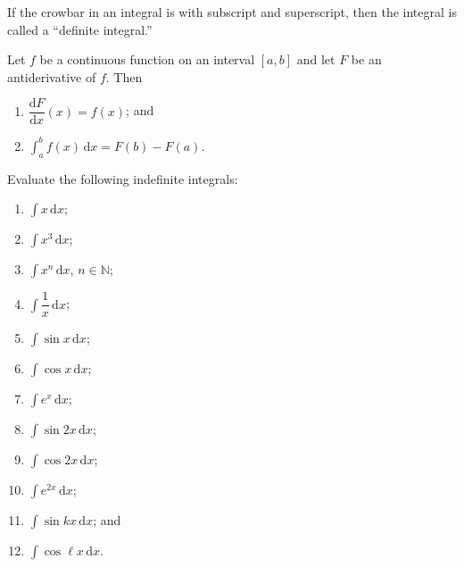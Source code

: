 \documentclass[11pt]{article}
\theoremstyle{break}
\theoremstyle{no_label}
\newcommand{\derivative}[2]{\dfrac{\dd{#1}}{\dd{#2}}}
\newcommand{\dd}{\text{d}}
\newcommand{\ddi}{\text{$\,$d}}
\newcommand{\bbN}{\mathbb{N}}
\numberwithin{equation}{theorem}
\begin{document}
\begin{remark}
    If the crowbar in an integral is with subscript and superscript, then the integral is called a ``definite integral.''
\end{remark}

\begin{theorem}
    Let $f$ be a continuous function on an interval $[a, b]$ and let $F$ be an antiderivative of $f$. Then
    \begin{enumerate}
        \item $\derivative{F}{x}(x)=f(x)$; and
        \item $\displaystyle\int_a^b f(x)\ddi x=F(b)-F(a)$.
    \end{enumerate}
\end{theorem}

\newpage

\begin{example}
    Evaluate the following indefinite integrals:\vspace{-1.8em}
    \begin{multicols}{3}
        \begin{enumerate}
            \item $\displaystyle\int x\ddi x$;
            \item $\displaystyle\int x^3\ddi x$;
            \item $\displaystyle\int x^n\ddi x$, $n\in\bbN$;
            \item $\displaystyle\int \dfrac{1}{x}\ddi x$;
            \item $\displaystyle\int \sin x\ddi x$;
            \item $\displaystyle\int \cos x\ddi x$;
            \item $\displaystyle\int e^x\ddi x$;
            \item $\displaystyle\int \sin 2x\ddi x$;
            \item $\displaystyle\int \cos 2x\ddi x$;
            \item $\displaystyle\int e^{2x}\ddi x$;
            \item $\displaystyle\int \sin kx\ddi x$; and
            \item $\displaystyle\int \cos \ell x\ddi x$.
        \end{enumerate}
    \end{multicols}\vspace{0.1em}
\end{example}
\end{document}

